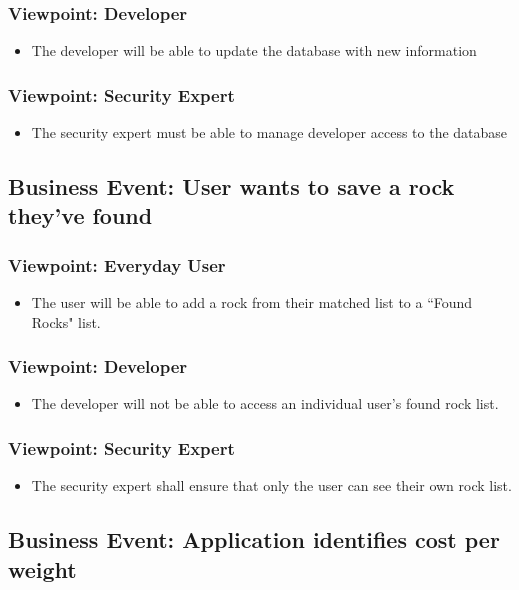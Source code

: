 \documentclass[titlepage]{article}
\begin{document}
	\subsubsection {Viewpoint: Developer}
		\begin{itemize}
			\item The developer will be able to update the database with new information
		\end{itemize}
	\subsubsection {Viewpoint: Security Expert}
		\begin{itemize}
			\item The security expert must be able to manage developer access to the database
		\end{itemize}
\subsection {Business Event: User wants to save a rock they've found}
	\subsubsection {Viewpoint: Everyday User}
		\begin{itemize}
			\item The user will be able to add a rock from their matched list to a ``Found Rocks" list.
		\end{itemize}
	\subsubsection {Viewpoint: Developer}
		\begin{itemize}
			\item The developer will not be able to access an individual user's found rock list.
		\end{itemize}
	\subsubsection {Viewpoint: Security Expert}
		\begin{itemize}
			\item The security expert shall ensure that only the user can see their own rock list.
		\end{itemize}
\subsection{Business Event: Application identifies cost per weight }
\end{document}
